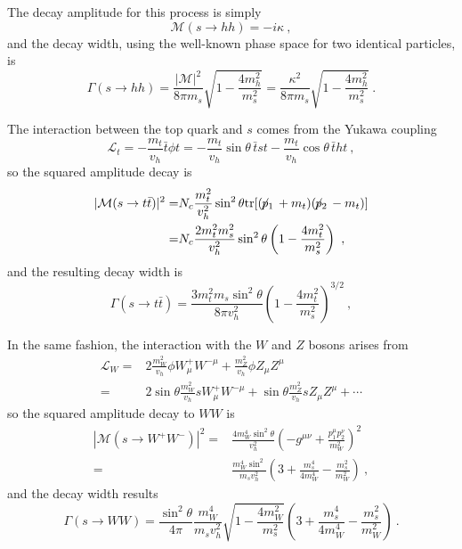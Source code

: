 \documentclass[aps,prd,preprintnumbers,nofootinbibn,twocolumn]{revtex4}
\newcommand{\tr}{\mathrm{tr}}
\newcommand{\sla}[1]{\!\not\!#1\,}
\begin{document}
The decay amplitude for this process is simply
\begin{equation}
\mathcal{M}(s\to hh)= -i \kappa\ ,
\end{equation}
and the decay width, using the well-known phase space for two identical particles, is
\begin{equation}
\Gamma(s\to hh) = \frac{|\mathcal{M}|^2}{8\pi m_s}\sqrt{1-\frac{4m_h^2}{m_s^2}} = \frac{\kappa^2}{8\pi m_s}\sqrt{1-\frac{4m_h^2}{m_s^2}}\ .
\end{equation}

The interaction between the top quark and $s$ comes from the Yukawa coupling 
\begin{equation}
\mathcal{L}_t = -\frac{m_t}{v_h}\bar{t}\phi t=  -\frac{m_t}{v_h}\sin\theta\, \bar{t} s t-\frac{m_t}{v_h}\cos\theta\, \bar{t} h t\ ,
\end{equation}
so the squared amplitude decay is 
\begin{align}
|\mathcal{M}(s\to t\bar{t})|^2 =& N_c \frac{m_t^2}{v_h^2}\sin^2\theta \tr[(\sla{p_1} + m_t)(\sla{p_2}-m_t)]\nonumber\\
=& N_c \frac{2 m_t^2 m_s^2 }{v_h^2} \sin^2 \theta \left(1-\frac{4 m_t^2}{m_s^2}\right)\ ,
\end{align}
and the resulting decay width is
\begin{equation}
\Gamma(s \to t \bar{t})= \frac{3 m_t^2 m_s \sin^2\theta}{8\pi  v_h^2} \left(1-\frac{4 m_t^2}{m_s^2}\right)^{3/2} \ ,
\end{equation}

In the same fashion, the interaction with the $W$ and $Z$ bosons  arises from
\begin{align}
\mathcal{L}_W =& 2 \frac{m_W^2}{v_h}\phi W^+_\mu W^{-\mu} + \frac{m_Z^2}{v_h} \phi Z_\mu Z^\mu\nonumber\\
=& 2 \sin \theta \frac{m_W^2}{v_h}s W^+_\mu W^{-\mu} + \sin\theta \frac{m_Z^2}{v_h} s Z_\mu Z^\mu + \cdots
\end{align}
so the squared amplitude decay to $WW$ is
\begin{align}
|\mathcal{M}(s\to W^+W^-)|^2 =& \frac{4 m_W^4 \sin^2\theta}{v_h^2} \left(-g^{\mu\nu}+\frac{p^\mu_1 p^\nu_2}{m_W^2} \right)^2\nonumber\\
=&  \frac{m_W^4 \sin^2 }{m_s v_h^2} \left(3+\frac{m_s^4}{4 m_W^4}-\frac{m_s^2}{m_W^2} \right)\ ,
\end{align}
and the decay width results
\begin{equation}
\Gamma(s \rightarrow WW)=  \frac{\sin^2\theta }{4 \pi } \frac{m_W^4}{m_s v_h^2} \sqrt{ 1- \frac{4 m_W^2}{m_s^2}}
\left(3+\frac{m_s^4}{4 m_W^4}-\frac{m_s^2}{m_W^2} \right)\ .
\end{equation}
\end{document}
